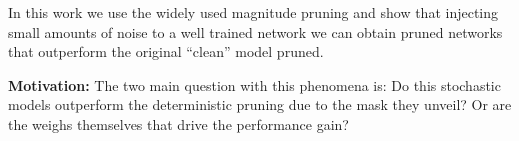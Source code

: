     





    In this work we use the widely used magnitude pruning and show that injecting small amounts of noise to a well
    trained network we can obtain pruned networks that  outperform the original
    ``clean'' model pruned.

    \textbf{Motivation:} The two main question with this phenomena is:
    Do this stochastic models outperform the deterministic pruning due to the
    mask they unveil? Or are the weighs themselves that drive the performance
    gain?










